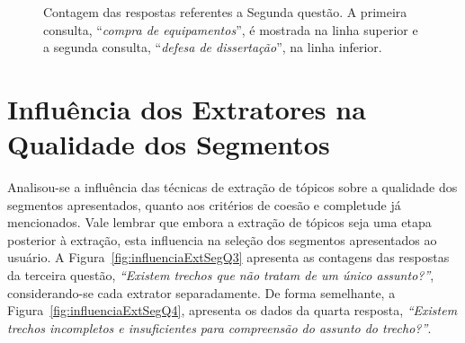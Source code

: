 \begin{figure}[!h]
	\caption{Contagem das respostas referentes a Segunda questão. A primeira consulta, ``\textit{compra de equipamentos}'', é mostrada na linha superior e a segunda consulta, ``\textit{defesa de dissertação}'', na linha inferior.}
	\label{fig:c12-q2}
\end{figure}








\section{Influência dos Extratores na Qualidade dos Segmentos}

Analisou-se a influência das técnicas de extração de tópicos sobre a qualidade dos segmentos apresentados, quanto aos critérios de coesão e completude já mencionados. Vale lembrar que embora a extração de tópicos seja uma etapa posterior à extração, esta influencia na seleção dos segmentos apresentados ao usuário. 
A Figura~\ref{fig:influenciaExtSegQ3} apresenta as contagens das respostas da terceira questão, \textit{``Existem trechos que não tratam de um único assunto?''}, considerando-se cada extrator separadamente. De forma semelhante, a Figura~\ref{fig:influenciaExtSegQ4}, apresenta os dados da quarta resposta, \textit{``Existem trechos incompletos e insuficientes para compreensão do assunto do trecho?''}.



